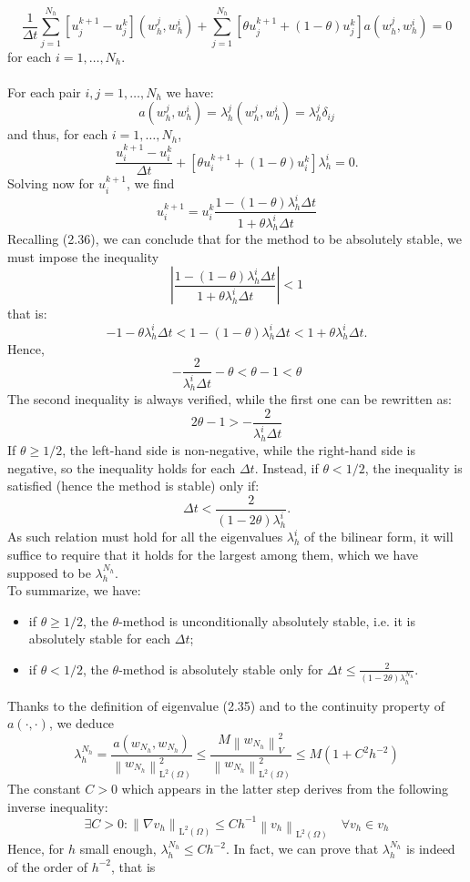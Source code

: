 \documentclass[11pt]{book}
\begin{document}
$$
\frac{1}{\Delta t} \sum_{j=1}^{N_{h}}\left[u_{j}^{k+1}-u_{j}^{k}\right]\left(w_{h}^{j}, w_{h}^{i}\right)+\sum_{j=1}^{N_{h}}\left[\theta u_{j}^{k+1}+(1-\theta) u_{j}^{k}\right] a\left(w_{h}^{j}, w_{h}^{i}\right)=0
$$
for each $i=1, \ldots, N_{h}$. \\ \\
For each pair $i, j=1, \ldots, N_{h}$ we have:
$$
a\left(w_{h}^{j}, w_{h}^{i}\right)=\lambda_{h}^{j}\left(w_{h}^{j}, w_{h}^{i}\right)=\lambda_{h}^{j} \delta_{i j}
$$
and thus, for each $i=1, \ldots, N_{h}$,
$$
\frac{u_{i}^{k+1}-u_{i}^{k}}{\Delta t}+\left[\theta u_{i}^{k+1}+(1-\theta) u_{i}^{k}\right] \lambda_{h}^{i}=0 .
$$
Solving now for $u_{i}^{k+1}$, we find
$$
u_{i}^{k+1}=u_{i}^{k} \frac{1-(1-\theta) \lambda_{h}^{i} \Delta t}{1+\theta \lambda_{h}^{i} \Delta t}
$$
Recalling (2.36), we can conclude that for the method to be absolutely stable, we must impose the inequality
$$
\left|\frac{1-(1-\theta) \lambda_{h}^{i} \Delta t}{1+\theta \lambda_{h}^{i} \Delta t}\right|<1
$$
that is:
$$
-1-\theta \lambda_{h}^{i} \Delta t<1-(1-\theta) \lambda_{h}^{i} \Delta t<1+\theta \lambda_{h}^{i} \Delta t .
$$
Hence,
$$
-\frac{2}{\lambda_{h}^{i} \Delta t}-\theta<\theta-1<\theta
$$
The second inequality is always verified, while the first one can be rewritten as:
$$
2 \theta-1>-\frac{2}{\lambda_{h}^{i} \Delta t}
$$
If $\theta \geq 1 / 2$, the left-hand side is non-negative, while the right-hand side is negative, so the inequality holds for each $\Delta t$. Instead, if $\theta<1 / 2$, the inequality is satisfied (hence the method is stable) only if:
$$
\Delta t<\frac{2}{(1-2 \theta) \lambda_{h}^{i}}.
$$
As such relation must hold for all the eigenvalues $\lambda_{h}^{i}$ of the bilinear form, it will suffice to require that it holds for the largest among them, which we have supposed to be $\lambda_{h}^{N_{h}}$.\\
To summarize, we have:
\begin{itemize}
  \item if $\theta \geq 1 / 2$, the $\theta$-method is unconditionally absolutely stable, i.e. it is absolutely stable for each $\Delta t$;
  \item if $\theta<1 / 2$, the $\theta$-method is absolutely stable only for $\Delta t \leq \frac{2}{(1-2 \theta) \lambda_{h}^{N_{h}}}$.
\end{itemize}
Thanks to the definition of eigenvalue (2.35) and to the continuity property of $a(\cdot, \cdot)$, we deduce
$$
\lambda_{h}^{N_{h}}=\frac{a\left(w_{N_{h}}, w_{N_{h}}\right)}{\left\|w_{N_{h}}\right\|_{\mathrm{L}^{2}(\Omega)}^{2}} \leq \frac{M\left\|w_{N_{h}}\right\|_{V}^{2}}{\left\|w_{N_{h}}\right\|_{\mathrm{L}^{2}(\Omega)}^{2}} \leq M\left(1+C^{2} h^{-2}\right)
$$
The constant $C>0$ which appears in the latter step derives from the following inverse inequality:
$$
\exists C>0:\left\|\nabla v_{h}\right\|_{\mathrm{L}^{2}(\Omega)} \leq C h^{-1}\left\|v_{h}\right\|_{\mathrm{L}^{2}(\Omega)} \quad \forall v_{h} \in v_{h}
$$
Hence, for $h$ small enough, $\lambda_{h}^{N_{h}} \leq C h^{-2}$. In fact, we can prove that $\lambda_{h}^{N_{h}}$ is indeed of the order of $h^{-2}$, that is
\end{document}
